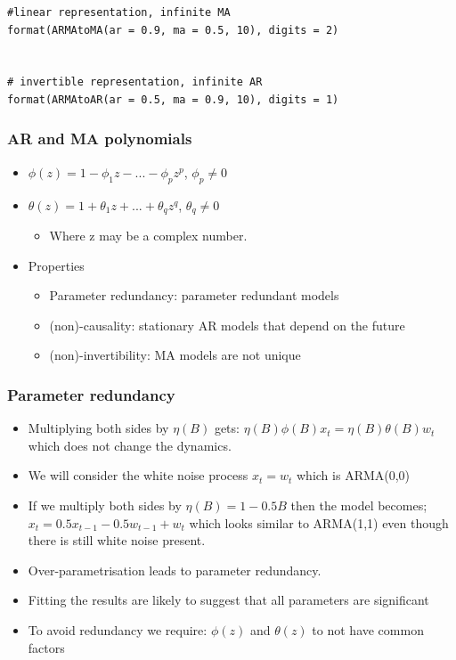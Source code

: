 \documentclass{article}
\begin{document}
\begin{lstlisting}
#linear representation, infinite MA
format(ARMAtoMA(ar = 0.9, ma = 0.5, 10), digits = 2)


# invertible representation, infinite AR
format(ARMAtoAR(ar = 0.5, ma = 0.9, 10), digits = 1)
\end{lstlisting}

\subsubsection{AR and MA polynomials}
\begin{itemize}
    \item $\phi(z) = 1 - \phi_1 z - ... - \phi_p z^p$,    $\phi_p \neq 0$
    \item $\theta(z) = 1 + \theta_1 z + ... + \theta_q z^q$,    $\theta_q \neq 0$
    \begin{itemize}
        \item Where z may be a complex number.
    \end{itemize}
    \item Properties
    \begin{itemize}
        \item Parameter redundancy: parameter redundant models
        \item (non)-causality: stationary AR models that depend on the future
        \item (non)-invertibility: MA models are not unique
    \end{itemize}
\end{itemize}


\subsubsection{Parameter redundancy}
\begin{itemize}
    \item Multiplying both sides by $\eta(B)$ gets: $\eta(B) \phi(B)x_t = \eta(B) \theta(B) w_t$ which does not change the dynamics.
    \item We will consider the white noise process $x_t = w_t$ which is ARMA(0,0)
    \item If we multiply both sides by $\eta(B) = 1 - 0.5B$ then the model becomes;
    \subitem $x_t = 0.5 x_{t-1} - 0.5w_{t-1} + w_t$ which looks similar to ARMA(1,1) even though there is still white noise present.
    \item Over-parametrisation leads to parameter redundancy.
    \item Fitting the results are likely to suggest that all parameters are significant
    \item To avoid redundancy we require: $\phi(z)$ and $\theta(z)$ to not have common factors
\end{itemize}
\end{document}
